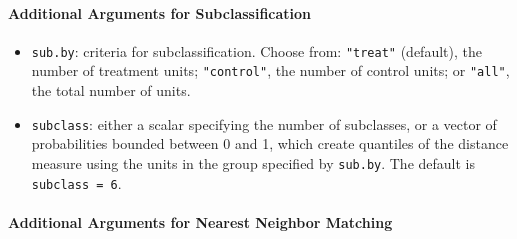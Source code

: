 \paragraph{Additional Arguments for Subclassification}
\label{subsubsec:inputs-subclass}

\begin{itemize}
\item \texttt{sub.by}: criteria for subclassification.  Choose from:
  \texttt{"treat"} (default), the number of treatment units;
  \texttt{"control"}, the number of control units; or \texttt{"all"},
  the total number of units.
\item \texttt{subclass}: either a scalar specifying the number of
  subclasses, or a vector of probabilities bounded between 0 and 1,
  which create quantiles of the distance measure using the units in
  the group specified by \texttt{sub.by}.  The default is
  \texttt{subclass = 6}.
\end{itemize}

\paragraph{Additional Arguments for Nearest Neighbor Matching}
\label{subsubsec:inputs-nearest}

